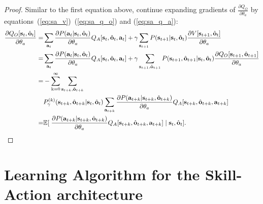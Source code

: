 \begin{proof} Similar to the first equation above, continue expanding
  gradients of $\frac{\partial Q_O}{\partial \theta_a}$ by
  equations~(\ref{eq:sa_v})~(\ref{eq:sa_q_o}) and
  (\ref{eq:sa_q_a}):
    \begin{align*}
      \frac{\partial Q_O[{\mathbf{s}}_t,\hat{{\mathbf{o}}}_t]}{ \partial \theta_a }=&\sum_{{\mathbf{a}}_t}\frac{\partial P({\mathbf{a}}_t|{\mathbf{s}}_t,\hat{{\mathbf{o}}}_t)}{\partial \theta_a}Q_A[{\mathbf{s}}_t, \hat{{\mathbf{o}}}_t,{\mathbf{a}}_t]+\gamma\sum_{{\mathbf{s}}_{t+1}}P({\mathbf{s}}_{t+1}|{\mathbf{s}}_t,\hat{{\mathbf{o}}}_t)\frac{\partial V[{\mathbf{s}}_{t+1},\hat{{\mathbf{o}}}_t]}{\partial \theta_a}\\
      =&\sum_{{\mathbf{a}}_t}\frac{\partial P({\mathbf{a}}_t|{\mathbf{s}}_t,\hat{{\mathbf{o}}}_t)}{\partial \theta_a}Q_A[{\mathbf{s}}_t, \hat{{\mathbf{o}}}_t,{\mathbf{a}}_t]+\gamma\sum_{{\mathbf{s}}_{t+1},\hat{{\mathbf{o}}}_{t+1}}P({\mathbf{s}}_{t+1},\hat{{\mathbf{o}}}_{t+1}|{\mathbf{s}}_t,\hat{{\mathbf{o}}}_t)\frac{\partial Q_O[{\mathbf{s}}_{t+1},\hat{{\mathbf{o}}}_{t+1}]}{\partial \theta_a}\\
      =&-\sum_{{\textnormal{k}}=0}^\infty\sum_{{\mathbf{s}}_{t+k},\hat{{\mathbf{o}}}_{t+k}}\\
      &P_{\gamma}^{(k)}({\mathbf{s}}_{t+k},\hat{{\mathbf{o}}}_{t+k}|{\mathbf{s}}_{t},\hat{{\mathbf{o}}}_{t})\sum_{{\mathbf{a}}_{t+k}}\frac{\partial P({\mathbf{a}}_{t+k}|{\mathbf{s}}_{t+k},\hat{{\mathbf{o}}}_{t+k})}{\partial \theta_a}Q_A[ {\mathbf{s}}_{t+k},\hat{{\mathbf{o}}}_{t+k},{\mathbf{a}}_{t+k}]\\
      =&\mathbb{E}[\;\frac{\partial P({\mathbf{a}}_{t+k}|{\mathbf{s}}_{t+k},\hat{{\mathbf{o}}}_{t+k})}{\partial \theta_a}Q_A[ {\mathbf{s}}_{t+k},\hat{{\mathbf{o}}}_{t+k},{\mathbf{a}}_{t+k}]\; | \; {\mathbf{s}}_t,\hat{{\mathbf{o}}}_t].
  \end{align*}
\end{proof}

\newpage
\section{Learning Algorithm for the Skill-Action
  architecture}
\label{sec:append_algo}

